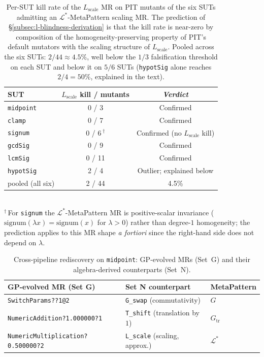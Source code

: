 \documentclass[acmsmall,screen,review]{acmart}
\begin{document}
\begin{table}[h]
\centering
\caption{Per-SUT kill rate of the $L_{\mathrm{scale}}$ MR on PIT
mutants of the six SUTs admitting an $\mathcal{L}^{*}$-MetaPattern scaling
MR. The prediction of \S\ref{subsec:l-blindness-derivation} is that
the kill rate is near-zero by composition of the
homogeneity-preserving property of PIT's default mutators with the
scaling structure of $L_{\mathrm{scale}}$. Pooled across the six SUTs:
$2/44 \approx 4.5\%$, well below the $1/3$ falsification threshold on
each SUT and below it on $5/6$ SUTs (\texttt{hypotSig} alone reaches
$2/4 = 50\%$, explained in the text).}
\label{tab:l-blindness}
\small
\begin{tabular}{lcc}
\toprule
SUT & $L_{\mathrm{scale}}$ kill / mutants & \emph{Verdict} \\
\midrule
\texttt{midpoint}  &  0 / 3   & Confirmed \\
\texttt{clamp}     &  0 / 7   & Confirmed \\
\texttt{signum}    &  0 / 6\,$^{\dagger}$ & Confirmed (no $L_{\mathrm{scale}}$ kill) \\
\texttt{gcdSig}    &  0 / 9   & Confirmed \\
\texttt{lcmSig}    &  0 / 11  & Confirmed \\
\texttt{hypotSig}  &  2 / 4   & Outlier; explained below \\
\midrule
pooled (all six)   &  2 / 44   & 4.5\% \\
\bottomrule
\end{tabular}\\[0.4em]
{\footnotesize $^{\dagger}$\,For \texttt{signum} the $\mathcal{L}^{*}$-MetaPattern MR
is positive-scalar invariance ($\mathrm{signum}(\lambda x) = \mathrm{signum}(x)$
for $\lambda > 0$) rather than degree-$1$ homogeneity; the prediction
applies to this MR shape \emph{a fortiori} since the right-hand side
does not depend on $\lambda$.}
\end{table}

\begin{table}[h]
\centering
\caption{Cross-pipeline rediscovery on \texttt{midpoint}: GP-evolved
MRs (Set~G) and their algebra-derived counterparts (Set~N).}
\label{tab:rediscovery}
\small
\begin{tabular}{lll}
\toprule
GP-evolved MR (Set G) & Set N counterpart & MetaPattern \\
\midrule
\texttt{SwitchParams??1@2}                & \texttt{G\_swap} (commutativity)         & $G$ \\
\texttt{NumericAddition?1.000000?1}       & \texttt{T\_shift} (translation by $1$)   & $G_{\mathrm{tr}}$ \\
\texttt{NumericMultiplication?0.500000?2} & \texttt{L\_scale} (scaling, approx.)     & $\mathcal{L}^{*}$ \\
\bottomrule
\end{tabular}
\end{table}
\end{document}
